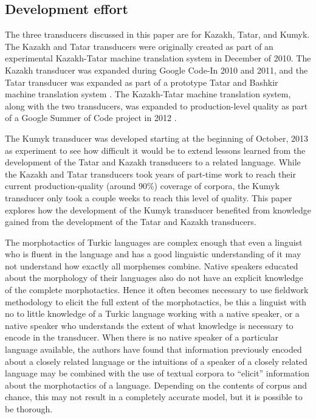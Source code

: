 \documentclass[a4paper,11pt,twocolumn]{article}
\begin{document}



\subsection{Development effort}

The three transducers discussed in this paper are for Kazakh, Tatar, and Kumyk.  The Kazakh and Tatar transducers were originally created as part of an experimental Kazakh-Tatar machine translation system in December of 2010.  The Kazakh transducer was expanded during Google Code-In 2010 and 2011, and the Tatar transducer was expanded as part of a prototype Tatar and Bashkir machine translation system \citep{tyerswashingtonsalimzyanbattalov12}.  The Kazakh-Tatar machine translation system, along with the two transducers, was expanded to production-level quality as part of a Google Summer of Code project in 2012 \citep{salimzyanov2013}.

The Kumyk transducer was developed starting at the beginning of October, 2013 as experiment to see how difficult it would be to extend lessons learned from the development of the Tatar and Kazakh transducers to a related language.  While the Kazakh and Tatar transducers took years of part-time work to reach their current production-quality (around 90\%) coverage of corpora, the Kumyk transducer only took a couple weeks to reach this level of quality.  This paper explores how the development of the Kumyk transducer benefited from knowledge gained from the development of the Tatar and Kazakh transducers.

The morphotactics of Turkic languages are complex enough that even a linguist who is fluent in the language and has a good linguistic understanding of it may not understand how exactly all morphemes combine.  Native speakers educated about the morphology of their languages also do not have an explicit knowledge of the complete morphotactics.  Hence it often becomes necessary to use fieldwork methodology to elicit the full extent of the morphotactics, be this a linguist with no to little knowledge of a Turkic language working with a native speaker, or a native speaker who understands the extent of what knowledge is necessary to encode in the transducer.  When there is no native speaker of a particular language available, the authors have found that information previously encoded about a closely related language or the intuitions of a speaker of a closely related language may be combined with the use of textual corpora to ``elicit'' information about the morphotactics of a language.  Depending on the contents of corpus and chance, this may not result in a completely accurate model, but it is possible to be thorough.
\end{document}
